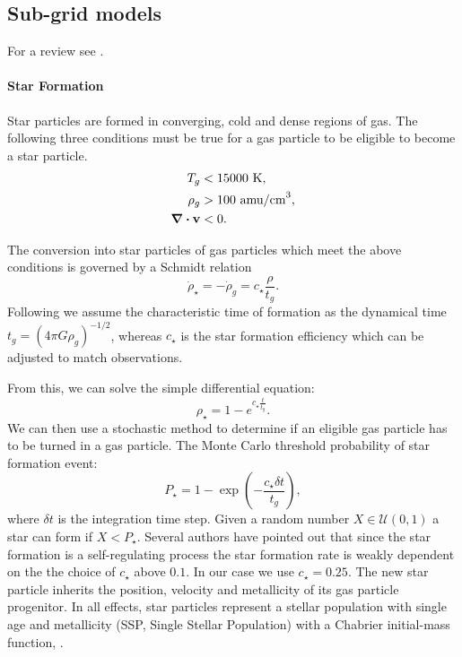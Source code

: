 \subsection{Sub-grid models}
For a review see \citet{Verbeke2017, Vandenbroucke2016}.

\paragraph{Star Formation}
\label{sec:star_formation}
Star particles are formed in converging, cold and dense regions of gas.
The following three conditions must be true for a gas particle to be eligible to become a star particle.
\begin{align*}
 T_g &< 15000 \text{~K},\\
 \rho_g &> 100 \text{~amu/cm}^{3},\\
 \div \boldsymbol{\mathbf{v}} & < 0.
\end{align*}

The conversion into star particles of gas particles which meet the above conditions is governed by a Schmidt relation \citep{Schmidt1959}
\begin{equation}
\dot{\rho}_\star = -\dot{\rho}_g = c_\star \frac{\rho}{t_g}.
\label{eq:schmidt_relation}
\end{equation}
Following \citet{Stinson2006} we assume the characteristic time of formation as the dynamical time $t_g = (4 \pi G \rho_g)^{-1/2}$, whereas $c_\star$ is the star formation efficiency which can be adjusted to match observations.

From this, we can solve the simple differential equation:
\begin{equation}
\rho_\star = 1 - e^{c_\star \frac{t}{t_g}}.
\end{equation}
We can then use a stochastic method to determine if an eligible gas particle has to be turned in a gas particle.
The Monte Carlo threshold probability of star formation event:
\begin{equation}
P_\star = 1-\exp(-\frac{c_\star \delta t}{t_g}),
\end{equation}
where $\delta t$ is the integration time step.
Given a random number $X \in \mathcal{U}(0,1)$ a star can form if $X < P_\star$.
Several authors \citep{Stinson2006, Revaz2009, Cloet-Osselaer2012} have pointed out that since the star formation is a self-regulating process the star formation rate is weakly dependent on the the choice of $c_\star$ above $0.1$. In our case we use $c_\star = 0.25$.
The new star particle inherits the position, velocity and metallicity of its gas particle progenitor.
In all effects, star particles represent a stellar population with single age and metallicity (SSP, Single Stellar Population) with a Chabrier initial-mass function, \citet{Chabrier2003}.

